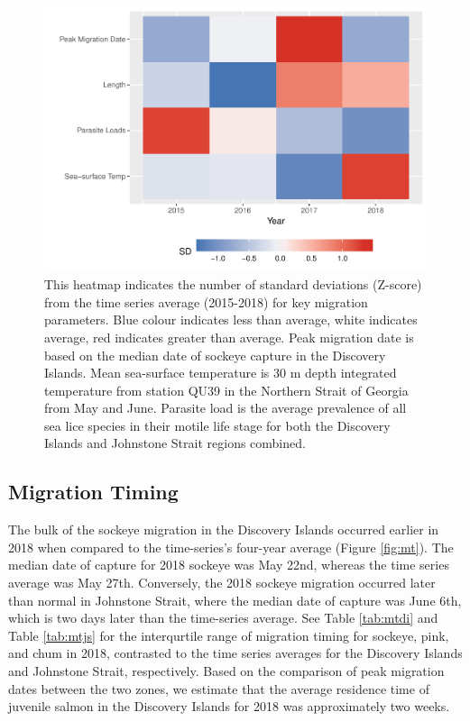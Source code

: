 \documentclass[fleqn,10pt]{wlpeerj} %
\begin{document}
\begin{figure}[H]
\includegraphics[width=0.8\linewidth]{peer_j_migration_dynamics_files/figure-latex/heatmap-1} \caption{This heatmap indicates the number of standard deviations (Z-score) from the time series average (2015-2018) for key migration parameters. Blue colour indicates less than average, white indicates average, red indicates greater than average. Peak migration date is based on the median date of sockeye capture in the Discovery Islands.  Mean sea-surface temperature is 30 m depth integrated temperature from station QU39 in the Northern Strait of Georgia from May and June. Parasite load is the average prevalence of all sea lice species in their motile life stage for both the Discovery Islands and Johnstone Strait regions combined.}\label{fig:heatmap}
\end{figure}

\subsection*{Migration Timing}\label{migration-timing}

The bulk of the sockeye migration in the Discovery Islands occurred
earlier in 2018 when compared to the time-series's four-year average
(Figure \ref{fig:mt}). The median date of capture for 2018 sockeye was
May 22nd, whereas the time series average was May 27th. Conversely, the
2018 sockeye migration occurred later than normal in Johnstone Strait,
where the median date of capture was June 6th, which is two days later
than the time-series average. See Table \ref{tab:mtdi} and Table
\ref{tab:mtjs} for the interqurtile range of migration timing for
sockeye, pink, and chum in 2018, contrasted to the time series averages
for the Discovery Islands and Johnstone Strait, respectively. Based on
the comparison of peak migration dates between the two zones, we
estimate that the average residence time of juvenile salmon in the
Discovery Islands for 2018 was approximately two weeks.
\end{document}
